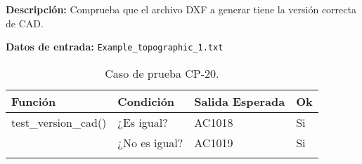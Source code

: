 \textbf{Descripción:} Comprueba que el archivo DXF a generar tiene la versión correcta de CAD.

\textbf{Datos de entrada:} \texttt{Example\_topographic\_1.txt}


\begin{longtable}[]{@{}llll@{}}
\toprule
\begin{minipage}[b]{0.5\columnwidth}\raggedright\strut
Función\strut
\end{minipage} & \begin{minipage}[b]{0.20\columnwidth}\raggedright\strut
Condición\strut
\end{minipage} & \begin{minipage}[b]{0.15\columnwidth}\raggedright\strut
Salida Esperada\strut
\end{minipage} & \begin{minipage}[b]{0.05\columnwidth}\raggedright\strut
Ok\strut
\end{minipage}\tabularnewline
\midrule
\endhead
\begin{minipage}[t]{0.5\columnwidth}\raggedright\strut
test\_version\_cad()\strut
\end{minipage} & \begin{minipage}[t]{0.20\columnwidth}\raggedright\strut
¿Es igual?\strut
\end{minipage} & \begin{minipage}[t]{0.15\columnwidth}\raggedright\strut
AC1018\strut
\end{minipage} & \begin{minipage}[t]{0.05\columnwidth}\raggedright\strut
Si\strut
\end{minipage}\tabularnewline
\begin{minipage}[t]{0.5\columnwidth}\raggedright\strut
\strut
\end{minipage} & \begin{minipage}[t]{0.20\columnwidth}\raggedright\strut
¿No es igual?\strut
\end{minipage} & \begin{minipage}[t]{0.15\columnwidth}\raggedright\strut
AC1019\strut
\end{minipage} & \begin{minipage}[t]{0.05\columnwidth}\raggedright\strut
Si\strut
\end{minipage}\tabularnewline

\bottomrule
\caption{Caso de prueba CP-20.}
\end{longtable}